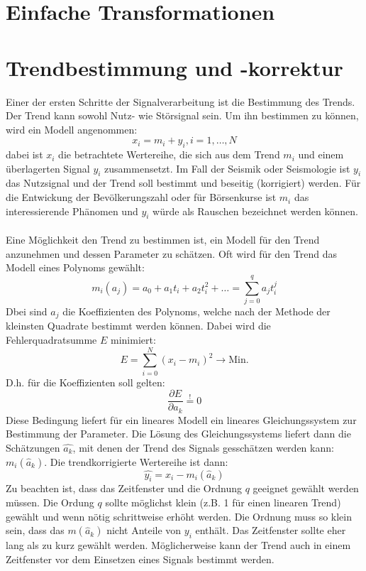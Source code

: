\section{Einfache Transformationen}

\section{Trendbestimmung und -korrektur}
Einer der ersten Schritte der Signalverarbeitung ist die Bestimmung des Trends. Der Trend kann sowohl Nutz- wie Störsignal sein. Um ihn bestimmen zu können, wird ein Modell angenommen:
\[
x_i=m_i + y_i, i=1,\dots, N
\]
 dabei ist $x_i$ die betrachtete Wertereihe, die sich aus dem Trend $m_i$ und einem überlagerten Signal $y_i$ zusammensetzt. Im Fall der Seismik oder Seismologie ist ${y_i}$ das Nutzsignal und der Trend soll bestimmt und beseitig (korrigiert) werden. Für die Entwickung der Bevölkerungszahl oder für Börsenkurse ist ${m_i}$ das interessierende Phänomen und ${y_i}$ würde als Rauschen bezeichnet werden können.\\\\
Eine Möglichkeit den Trend zu bestimmen ist, ein Modell für den Trend anzunehmen und dessen Parameter zu schätzen. Oft wird für den Trend das Modell eines Polynoms gewählt:
\[
m_i(a_j)=a_0+ a_1t_i+a_2t_i^2+\dots = \sum\limits_{j=0}^{q} a_j t_i^j
\]
Dbei sind ${a_j}$ die Koeffizienten des Polynoms, welche nach der Methode der kleinsten Quadrate bestimmt werden können. Dabei wird die Fehlerquadratsumme $E$ minimiert:
\[
E=\sum\limits_{i=0}^N (x_i -m_i)^2 \rightarrow \mbox{Min.}
\]
D.h. für die Koeffizienten soll gelten:
\[
\frac{\partial E}{\partial a_k}\stackrel{!}{=}0
\]
Diese Bedingung liefert für ein lineares Modell ein lineares Gleichungssystem zur Bestimmung der Parameter. Die Lösung des Gleichungssystems liefert dann die Schätzungen $\hat{a_k}$, mit denen der Trend des Signals gesschätzen werden kann: $m_i(\hat a_k)$. Die trendkorrigierte Wertereihe ist dann:
\[
\hat{y_i}=x_i-m_i(\hat a_k)
\]
Zu beachten ist, dass das Zeitfenster und die Ordnung $q$ geeignet gewählt werden müssen. Die Ordung $q$ sollte möglichst klein (z.B. 1 für einen linearen Trend) gewählt und wenn nötig schrittweise erhöht werden. Die Ordnung muss so klein sein, dass das $m(\hat a_k)$ nicht Anteile von ${y_i}$ enthält. Das Zeitfenster sollte eher lang als zu kurz gewählt werden. Möglicherweise kann der Trend auch in einem Zeitfenster vor dem Einsetzen eines Signals bestimmt werden.\\\\ 
